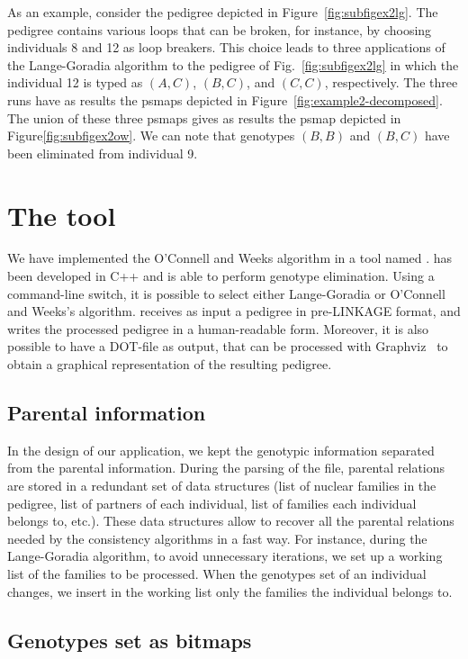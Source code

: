 As an example, consider the pedigree depicted in
Figure~\ref{fig:subfigex2lg}. The pedigree contains various loops that can be
broken, for instance, by choosing individuals 8 and 12 as loop breakers. This
choice leads to three applications of the Lange-Goradia algorithm to the
pedigree of Fig.~\ref{fig:subfigex2lg} in which the individual 12 is typed as
$(A,C)$, $(B,C)$, and $(C,C)$, respectively. The three runs have as results the
psmaps depicted in Figure~\ref{fig:example2-decomposed}. The union of these
three psmaps gives as results the psmap depicted in
Figure\ref{fig:subfigex2ow}. We can note that genotypes $(B,B)$ and $(B,C)$ have
been eliminated from individual 9. 

\section{The {\TheTool} tool}
\label{sec:imple}

We have implemented the O'Connell and Weeks algorithm in  a tool named
\TheTool. {\TheTool} has been developed in C++ and is able to perform genotype
elimination. Using a command-line switch, it is possible to select either Lange-Goradia
or O'Connell and Weeks's algorithm. {\TheTool} receives as input a pedigree in
pre-LINKAGE format, and writes the processed pedigree in a human-readable
form. Moreover, it is also possible to have a DOT-file as output, that can be
processed with Graphviz~\cite{graphviz} to obtain a graphical representation of
the resulting pedigree.

\subsection{Parental information}
\label{sec:pedigr-data-struct}
In the design of our application, we kept the genotypic information separated 
from the parental information. During the parsing of the file, 
parental relations are stored in a redundant set of data structures (list of nuclear families in the
pedigree, list of partners of each individual, list of families each individual
belongs to, etc.). These data structures allow to recover all the parental
relations needed by the consistency algorithms in a fast way. For instance,
during the Lange-Goradia algorithm, to avoid unnecessary iterations, we set up a
working list of the families to be processed. When the genotypes set of an individual
changes, we insert in the working list only the families the individual belongs
to. 

\subsection{Genotypes set as bitmaps}
\label{sec:genotypes-set-as}

